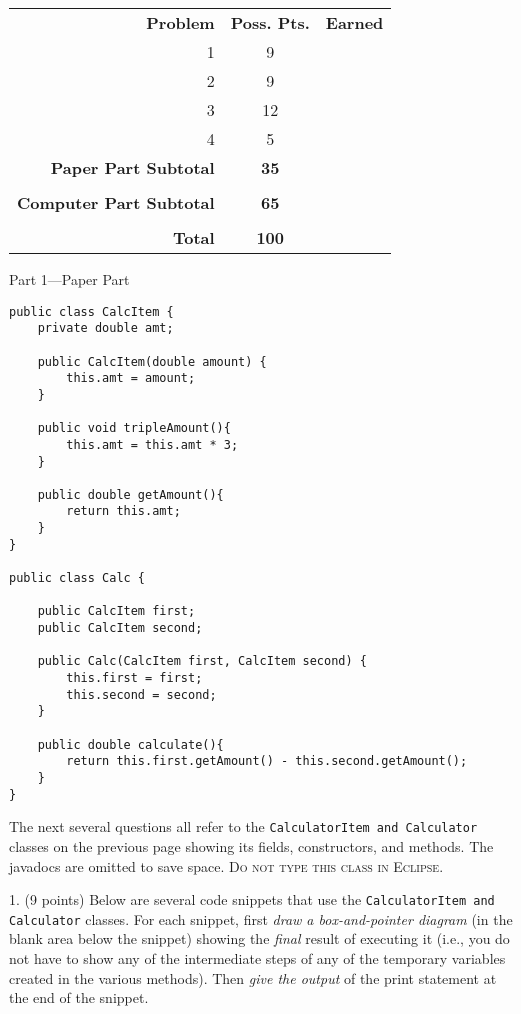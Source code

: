\documentclass[12pt,twoside]{article}
\newcommand{\fillInBlank}[1][0.5in]{\underline{\hspace{#1}}}
\newcommand{\code}[1]{\texttt{#1}}
\begin{document}
\begin{flushright}
\begin{tabular}{rcc}
\textbf{Problem} & \textbf{Poss. Pts.} & \textbf{Earned} \\
1 & 9 & \fillInBlank \\
2 & 9 & \fillInBlank \\
3 & 12 & \fillInBlank \\
4 & 5 & \fillInBlank \\
\textbf{Paper Part Subtotal} & \textbf{35} & \fillInBlank\\
 & & \\
\textbf{Computer Part Subtotal} & \textbf{65} & \fillInBlank\\
 & & \\
\textbf{Total} & \textbf{100} & \fillInBlank
\end{tabular}
\end{flushright}
\clearpage

{\Large Part 1---Paper Part}

\begin{center}
\begin{minipage}[t]{0.9\linewidth}
\begin{lstlisting}
public class CalcItem {
	private double amt;
	
	public CalcItem(double amount) {
		this.amt = amount;
	}
	
	public void tripleAmount(){
		this.amt = this.amt * 3;
	}
	
	public double getAmount(){
		return this.amt;
	}
}

public class Calc {
	
	public CalcItem first;
	public CalcItem second;

	public Calc(CalcItem first, CalcItem second) {
		this.first = first;
		this.second = second;
	}
	
	public double calculate(){
		return this.first.getAmount() - this.second.getAmount();
	}	
}

\end{lstlisting}
\end{minipage}
\end{center}
\clearpage

The next several questions all refer to the \code{CalculatorItem and Calculator} classes on the previous page showing its fields, constructors, and methods.  The javadocs are omitted to save space. \textsc{Do not type this class in Eclipse}.

1. (9 points) Below are several code snippets that use the \code{CalculatorItem and Calculator} classes.  For each snippet, first 
\emph{draw a box-and-pointer diagram} (in the blank area below the snippet) showing the \emph{final} result of executing it (i.e., you do not have to show any of the intermediate steps of any of the temporary variables created in the various methods).  Then \emph{give the output} of the print statement at the end of the snippet. 
\end{document}

